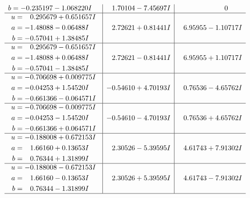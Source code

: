 \documentclass[1p]{elsarticle_modified}
\theoremstyle{definition}
\begin{document}
$$\begin{array}{c|c|c}
\begin{aligned}
b &= -0.235197 - 1.068220 I\end{aligned}
 & \phantom{-}1.70104 - 7.45697 I & \phantom{-0.000000 } 0 \\ \hline\begin{aligned}
u &= \phantom{-}0.295679 + 0.651657 I \\
a &= -1.48088 - 0.06488 I \\
b &= -0.57041 + 1.38485 I\end{aligned}
 & \phantom{-}2.72621 + 0.81441 I & \phantom{-}6.95955 - 1.10717 I \\ \hline\begin{aligned}
u &= \phantom{-}0.295679 - 0.651657 I \\
a &= -1.48088 + 0.06488 I \\
b &= -0.57041 - 1.38485 I\end{aligned}
 & \phantom{-}2.72621 - 0.81441 I & \phantom{-}6.95955 + 1.10717 I \\ \hline\begin{aligned}
u &= -0.706698 + 0.009775 I \\
a &= -0.04253 + 1.54520 I \\
b &= -0.661366 - 0.064571 I\end{aligned}
 & -0.54610 + 4.70193 I & \phantom{-}0.76536 - 4.65762 I \\ \hline\begin{aligned}
u &= -0.706698 - 0.009775 I \\
a &= -0.04253 - 1.54520 I \\
b &= -0.661366 + 0.064571 I\end{aligned}
 & -0.54610 - 4.70193 I & \phantom{-}0.76536 + 4.65762 I \\ \hline\begin{aligned}
u &= -0.188008 + 0.672153 I \\
a &= \phantom{-}1.66160 + 0.13653 I \\
b &= \phantom{-}0.76344 + 1.31899 I\end{aligned}
 & \phantom{-}2.30526 - 5.39595 I & \phantom{-}4.61743 + 7.91302 I \\ \hline\begin{aligned}
u &= -0.188008 - 0.672153 I \\
a &= \phantom{-}1.66160 - 0.13653 I \\
b &= \phantom{-}0.76344 - 1.31899 I\end{aligned}
 & \phantom{-}2.30526 + 5.39595 I & \phantom{-}4.61743 - 7.91302 I\\
 \hline 
 \end{array}$$\newpage$$\begin{array}{c|c|c}  

\end{array}$$
\end{document}
